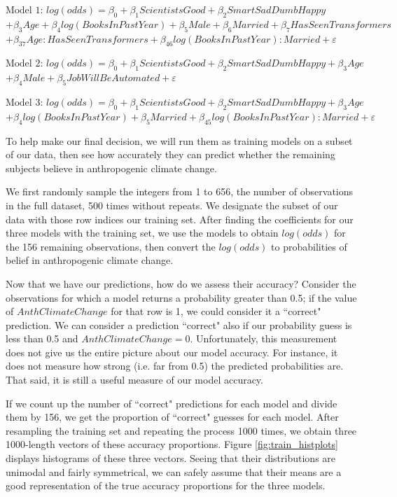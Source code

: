 \begin{center}
    $\text{Model 1: } log(odds) = \beta_0 + \beta_1 ScientistsGood + \beta_2 SmartSadDumbHappy$
    $+ \beta_3 Age + \beta_4 log(BooksInPastYear) + \beta_5 Male + \beta_6 Married + \beta_7 HasSeenTransformers$
    $+ \beta_{37} Age:HasSeenTransformers + \beta_{46} log(BooksInPastYear):Married + \varepsilon$


    \bigskip $\text{Model 2: } log(odds) = \beta_0 + \beta_1 ScientistsGood + \beta_2 SmartSadDumbHappy + \beta_3 Age$
    $+ \beta_4 Male + \beta_5 JobWillBeAutomated + \varepsilon$


    \bigskip $\text{Model 3: } log(odds) = \beta_0 + \beta_1 ScientistsGood + \beta_2 SmartSadDumbHappy + \beta_3 Age$
    $+ \beta_4 log(BooksInPastYear) + \beta_5 Married + \beta_{45} log(BooksInPastYear):Married + \varepsilon$
\end{center}

\par \bigskip To help make our final decision, we will run them as training models on a subset of our data, then see how accurately they can predict whether the remaining subjects believe in anthropogenic climate change. 

\par \bigskip We first randomly sample the integers from 1 to 656, the number of observations in the full dataset, 500 times without repeats. We designate the subset of our data with those row indices our training set. After finding the coefficients for our three models with the training set, we use the models to obtain $log(odds)$ for the 156 remaining observations, then convert the $log(odds)$ to probabilities of belief in anthropogenic climate change.

\par \bigskip Now that we have our predictions, how do we assess their accuracy? Consider the observations for which a model returns a probability greater than 0.5; if the value of $AnthClimateChange$ for that row is 1, we could consider it a ``correct" prediction. We can consider a prediction ``correct" also if our probability guess is less than 0.5 and $AnthClimateChange = 0$. Unfortunately, this measurement does not give us the entire picture about our model accuracy. For instance, it does not measure how strong (i.e. far from 0.5) the predicted probabilities are. That said, it is still a useful measure of our model accuracy.

\par \bigskip If we count up the number of ``correct" predictions for each model and divide them by 156, we get the proportion of ``correct" guesses for each model. After resampling the training set and repeating the process 1000 times, we obtain three 1000-length vectors of these accuracy proportions. Figure \ref{fig:train_histplots} displays histograms of these three vectors. Seeing that their distributions are unimodal and fairly symmetrical, we can safely assume that their means are a good representation of the true accuracy proportions for the three models.


